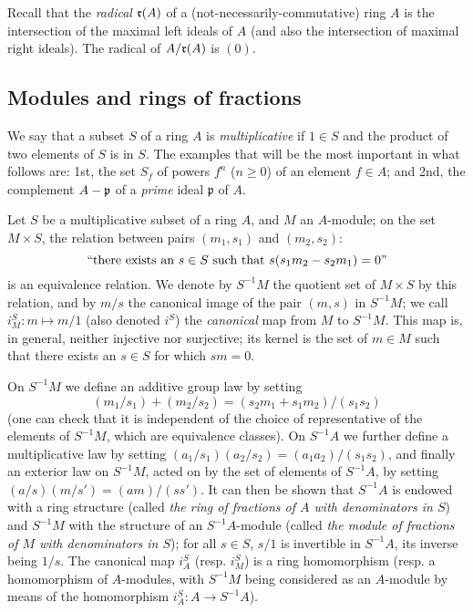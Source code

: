\begin{env}[1.1.2]
\label{0.1.1.2}
Recall that the \emph{radical} $\mathfrak{r}(A)$ of a (not-necessarily-commutative) ring $A$ is the intersection of the maximal left ideals of $A$ (and also the intersection of maximal right ideals).
The radical of $A/\mathfrak{r}(A)$ is $(0)$.
\end{env}

\subsection{Modules and rings of fractions}
\label{subsection:0.1.2}

\begin{env}[1.2.1]
\label{0.1.2.1}
We say that a subset $S$ of a ring $A$ is \emph{multiplicative} if $1\in S$ and the product of two elements of $S$ is in $S$.
The examples that will be the most important in what follows are: 1st, the set $S_f$ of powers $f^n$ ($n\geq 0$) of an element $f\in A$; and 2nd, the complement $A-\mathfrak{p}$ of a \emph{prime} ideal $\mathfrak{p}$ of $A$.
\end{env}

\begin{env}[1.2.2]
\label{0.1.2.2}
Let $S$ be a multiplicative subset of a ring $A$, and $M$ an $A$-module;
on the set $M\times S$, the relation between pairs $(m_1,s_1)$ and $(m_2,s_2)$:
\[
  ``\text{there exists an }s\in S\text{ such that }s(s_1 m_2-s_2 m_1)=0\text{''}
\]
is an equivalence relation. We denote by $S^{-1}M$ the quotient set of
$M\times S$ by this relation, and by $m/s$ the canonical image of the pair $(m,s)$ in $S^{-1}M$; we call $i_M^S:m\mapsto m/1$ (also denoted $i^S$) the
\emph{canonical} map from $M$ to $S^{-1}M$. This map is, in general, neither
injective nor surjective; its kernel is the set of $m\in M$ such that there
exists an $s\in S$ for which $sm=0$.

On $S^{-1}M$ we define an additive group law by setting
\[
  (m_1/s_1)+(m_2/s_2)=(s_2 m_1+s_1 m_2)/(s_1 s_2)
\]
(one can check that it is independent of the choice of representative of the elements of $S^{-1}M$, which are equivalence classes).
On $S^{-1}A$ we further define a multiplicative law by setting
$(a_1/s_1)(a_2/s_2)=(a_1 a_2)/(s_1 s_2)$, and finally an exterior law on
$S^{-1}M$, acted on by the set of elements of $S^{-1}A$, by setting
$(a/s)(m/s')=(am)/(ss')$.
It can then be shown that $S^{-1}A$ is endowed with a
ring structure (called \emph{the ring of fractions of $A$ with denominators in
$S$}) and $S^{-1}M$ with the structure of an $S^{-1}A$-module (called \emph{the
module of fractions of $M$ with denominators in $S$}); for all $s\in S$, $s/1$
is invertible in $S^{-1}A$, its inverse being $1/s$.
The canonical map $i_A^S$ (resp. $i_M^S$) is a ring homomorphism (resp. a homomorphism of $A$-modules,
with $S^{-1}M$ being considered as an $A$-module by means of the homomorphism
$i_A^S:A\to S^{-1}A$).
\end{env}

